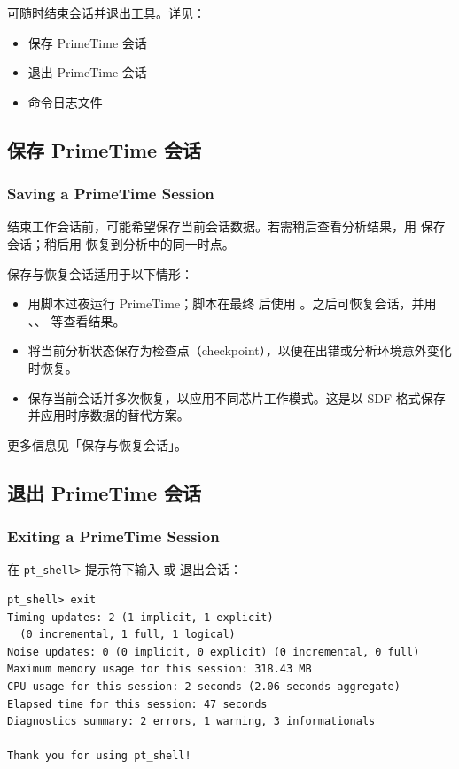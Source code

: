可随时结束会话并退出工具。详见：
\begin{itemize}
  \item 保存 PrimeTime 会话
  \item 退出 PrimeTime 会话
  \item 命令日志文件
\end{itemize}

\subsection{保存 PrimeTime 会话}
\subsubsection*{Saving a PrimeTime Session}

结束工作会话前，可能希望保存当前会话数据。若需稍后查看分析结果，用  保存会话；稍后用  恢复到分析中的同一时点。

保存与恢复会话适用于以下情形：
\begin{itemize}
  \item 用脚本过夜运行 PrimeTime；脚本在最终  后使用 。之后可恢复会话，并用 、、 等查看结果。
  \item 将当前分析状态保存为检查点（checkpoint），以便在出错或分析环境意外变化时恢复。
  \item 保存当前会话并多次恢复，以应用不同芯片工作模式。这是以 SDF 格式保存并应用时序数据的替代方案。
\end{itemize}

更多信息见「保存与恢复会话」。

\subsection{退出 PrimeTime 会话}
\subsubsection*{Exiting a PrimeTime Session}

在 \texttt{pt\_shell>} 提示符下输入  或  退出会话：
\begin{lstlisting}
pt_shell> exit
Timing updates: 2 (1 implicit, 1 explicit)
  (0 incremental, 1 full, 1 logical)
Noise updates: 0 (0 implicit, 0 explicit) (0 incremental, 0 full)
Maximum memory usage for this session: 318.43 MB
CPU usage for this session: 2 seconds (2.06 seconds aggregate)
Elapsed time for this session: 47 seconds
Diagnostics summary: 2 errors, 1 warning, 3 informationals

Thank you for using pt_shell!
\end{lstlisting}

